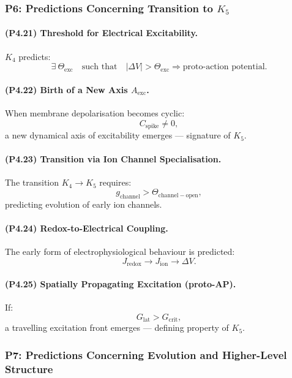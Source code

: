 \subsubsection{P6: Predictions Concerning Transition to \texorpdfstring{$K_5$}{K_5}}

\paragraph{(P4.21) Threshold for Electrical Excitability.}
$K_4$ predicts:
\[
\exists\ \Theta_{\mathrm{exc}} \quad \text{such that}\quad
|\Delta V| > \Theta_{\mathrm{exc}}
\Rightarrow \text{proto-action potential}.
\]

\paragraph{(P4.22) Birth of a New Axis $A_{\mathrm{exc}}$.}
When membrane depolarisation becomes cyclic:
\[
C_{\mathrm{spike}} \neq 0,
\]
a new dynamical axis of excitability emerges — signature of $K_5$.

\paragraph{(P4.23) Transition via Ion Channel Specialisation.}
The transition $K_4 \to K_5$ requires:
\[
g_{\mathrm{channel}} > \Theta_{\mathrm{channel-open}},
\]
predicting evolution of early ion channels.

\paragraph{(P4.24) Redox-to-Electrical Coupling.}
The early form of electrophysiological behaviour is predicted:
\[
J_{\mathrm{redox}} \to J_{\mathrm{ion}} \to \Delta V.
\]

\paragraph{(P4.25) Spatially Propagating Excitation (proto-AP).}
If:
\[
G_{\mathrm{lat}} > G_{\mathrm{crit}},
\]
a travelling excitation front emerges — defining property of $K_5$.

\subsubsection{P7: Predictions Concerning Evolution and Higher-Level Structure}

